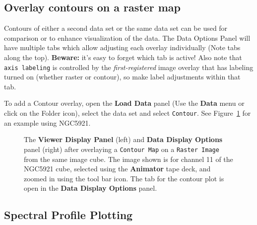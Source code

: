 \subsection{Overlay contours on a raster map}
\label{section:display.image.viewcontours}

Contours of either a second data set or the same data set can be used
for comparison or to enhance visualization of the data. The Data Options
Panel will have multiple tabs which allow adjusting each overlay
individually (Note tabs along the top).  {\bf Beware:} it's easy to forget
which tab is active!   Also note that {\tt axis labeling} is controlled
by the {\it first-registered} image overlay that has labeling turned on
(whether raster or contour), so make label adjustments within that tab.

To add a Contour overlay, open the {\bf Load Data} panel (Use the {\bf Data}
menu or click on the Folder icon), select the data set and select {\tt Contour}.
See Figure~\ref{fig:viewer_rascon} for an example using NGC5921.

 
\begin{figure}[h!]
\begin{center}
\caption{\label{fig:viewer_rascon} The {\bf Viewer Display Panel}
(left) and {\bf Data Display Options} panel (right) after overlaying
a {\tt Contour Map} on a {\tt Raster Image} from the same image cube.  The
image shown is for channel 11 of the NGC5921 cube, selected using
the {\bf Animator} tape deck, and zoomed in using the tool bar icon.
The tab for the contour plot is open in the {\bf Data Display Options} 
panel.} 
\hrulefill
\end{center}
\end{figure}

\subsection{Spectral Profile Plotting}
\label{section:display.image.specprof}

